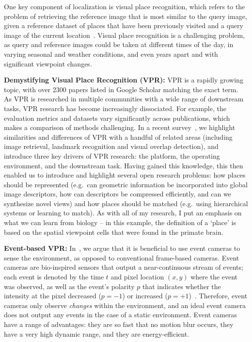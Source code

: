 \documentclass[conference]{IEEEtran}
\begin{document}
One key component of localization is visual place recognition, which refers to the problem of retrieving the reference image that is most similar to the query image, given a reference dataset of places that have been previously visited and a query image of the current location~\cite{FischerGargIJCAI2021}. Visual place recognition is a challenging problem, as query and reference images could be taken at different times of the day, in varying seasonal and weather conditions, and even years apart and with significant viewpoint changes.

\textbf{Demystifying Visual Place Recognition (VPR): }VPR is a rapidly growing topic, with over 2300 papers listed in Google Scholar matching the exact term. As VPR is researched in multiple communities with a wide range of downstream tasks, VPR research has become increasingly dissociated. For example, the evaluation metrics and datasets vary significantly across publications, which makes a comparison of methods challenging. In a recent survey~\cite{FischerGargIJCAI2021}, we highlight similarities and differences of VPR with a handful of related areas (including image retrieval, landmark recognition and visual overlap detection), and introduce three key drivers of VPR research: the platform, the operating environment, and the downstream task. Having gained this knowledge, this then enabled us to introduce and highlight several open research problems: how places should be represented (e.g.~can geometric information be incorporated into global image descriptors, how can descriptors be compressed efficiently, and can we synthesize novel views) and how places should be matched (e.g.~using hierarchical systems or learning to match). As with all of my research, I put an emphasis on what we can learn from biology -- in this example, the definition of a `place' is based on the spatial viewpoint cells that were found in the primate brain.

\textbf{Event-based VPR: }In~\cite{Fischer2020RAL}, we argue that it is beneficial to use event cameras to sense the environment, as opposed to conventional frame-based cameras. Event cameras are bio-inspired sensors that output a near-continuous stream of events; each event is denoted by the time $t$ and pixel location $(x, y)$ where the event was observed, as well as the event's polarity $p$ that indicates whether the intensity at the pixel decreased ($p=-1$) or increased ($p=+1$)~\cite{Gallego2019}. Therefore, event cameras only observe \emph{changes} within the environment, and an ideal event camera does not output any events in the case of a static environment. Event cameras have a range of advantages: they are so fast that no motion blur occurs, they have a very high dynamic range, and they are energy-efficient. 
\end{document}
